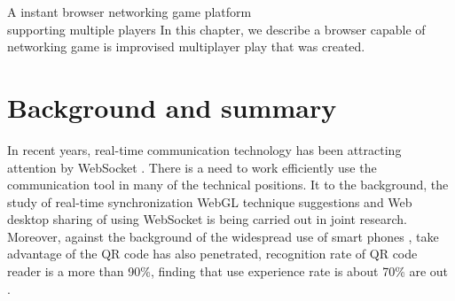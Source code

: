 \chapterhead
{A instant browser networking game platform\\
supporting multiple players}
{In this chapter, we describe a browser capable of networking game is improvised multiplayer play that was created.}


\section{Background and summary}

In recent years, real-time communication technology has been attracting attention by WebSocket \cite{websocket}. There is a need to work efficiently use the communication tool in many of the technical positions. It to the background, the study of real-time synchronization WebGL technique suggestions \cite{websocket_webgl} and Web desktop sharing of using WebSocket \cite{weboscket_desktop} is being carried out in joint research. Moreover, against the background of the widespread use of smart phones \cite{smartphone_share}, take advantage of the QR code \cite{qrcode} has also penetrated, recognition rate of QR code reader is a more than 90\%, finding that use experience rate is about 70\% are out \cite{qrcoderesearch}.

